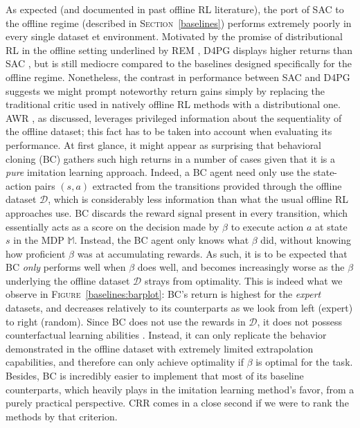 As expected (and documented in past offline RL literature),
the port of
SAC \cite{Haarnoja2018-bm}
to the offline regime (described in \textsc{Section}~\ref{baselines})
performs extremely poorly in every single dataset et environment.
Motivated by the promise of distributional RL \cite{Bellemare2017-yr, Dabney2017-to, Dabney2018-ya, Dabney2020-nm}
in the offline setting underlined by REM \cite{Agarwal2020-eu},
D4PG \cite{Barth-Maron2018-ot}
displays higher returns than SAC \cite{Haarnoja2018-bm},
but is still mediocre compared to the baselines designed specifically for the offline regime.
Nonetheless, the contrast in performance between SAC and D4PG
suggests we might prompt noteworthy return gains simply by replacing the traditional critic used in
natively offline RL methods with a distributional one.
AWR \cite{Peng2019-hu}, as discussed, leverages privileged information about the sequentiality of the offline dataset;
this fact has to be taken into account when evaluating its performance.
At first glance, it might appear as surprising that behavioral cloning (BC) gathers such high returns
in a number of cases given that it is a
\emph{pure} imitation learning \cite{Bagnell2015-ni} approach.
Indeed, a BC agent need only use the state-action pairs $(s,a)$ extracted from the transitions provided through
the offline dataset $\mathcal{D}$, which is considerably less information than what the usual offline RL
approaches use.
BC discards the reward signal present in every transition,
which essentially acts as a score on the decision made by $\beta$ to execute action $a$ at state $s$
in the MDP $\mathbb{M}$.
Instead, the BC agent only knows what $\beta$ did, without knowing how proficient $\beta$ was
at accumulating rewards.
As such, it is to be expected that BC \emph{only} performs well when $\beta$ does well, and becomes
increasingly worse as the $\beta$ underlying the offline dataset $\mathcal{D}$ strays from optimality.
This is indeed what we observe in \textsc{Figure}~\ref{baselines:barplot}: BC's return is highest for
the \textit{expert} datasets, and decreases relatively to its counterparts as we look
from left (expert) to right (random).
Since BC does not use the rewards in $\mathcal{D}$,
it does not possess counterfactual learning abilities \cite{Bottou2013-so}.
Instead, it can only replicate the behavior demonstrated in the offline dataset with extremely limited extrapolation
capabilities,
and therefore can only achieve optimality if $\beta$ is optimal for the task.
Besides, BC is incredibly easier to implement that most of its baseline counterparts, which heavily plays in
the imitation learning method's favor, from a purely practical perspective.
CRR
comes in a close second if we were to rank the methods by that criterion.

